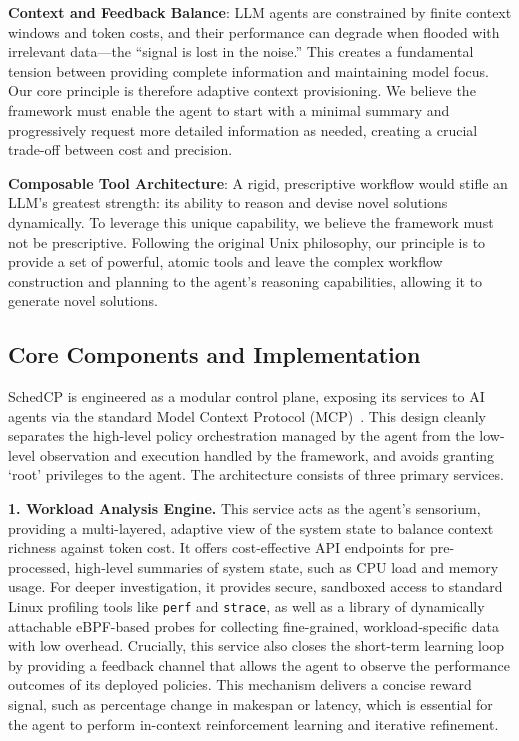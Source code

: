 \textbf{Context and Feedback Balance}: LLM agents are constrained by finite context windows and token costs, and their performance can degrade when flooded with irrelevant data—the ``signal is lost in the noise.'' This creates a fundamental tension between providing complete information and maintaining model focus. Our core principle is therefore adaptive context provisioning. We believe the framework must enable the agent to start with a minimal summary and progressively request more detailed information as needed, creating a crucial trade-off between cost and precision.

\textbf{Composable Tool Architecture}: A rigid, prescriptive workflow would stifle an LLM's greatest strength: its ability to reason and devise novel solutions dynamically. To leverage this unique capability, we believe the framework must not be prescriptive. Following the original Unix philosophy, our principle is to provide a set of powerful, atomic tools and leave the complex workflow construction and planning to the agent's reasoning capabilities, allowing it to generate novel solutions.

\subsection{Core Components and Implementation}
SchedCP is engineered as a modular control plane, exposing its services to AI agents via the standard Model Context Protocol (MCP)~\cite{anthropic2024mcp}. This design cleanly separates the high-level policy orchestration managed by the agent from the low-level observation and execution handled by the framework, and avoids granting `root' privileges to the agent. The architecture consists of three primary services.

\textbf{1. Workload Analysis Engine.} This service acts as the agent's sensorium, providing a multi-layered, adaptive view of the system state to balance context richness against token cost. It offers cost-effective API endpoints for pre-processed, high-level summaries of system state, such as CPU load and memory usage. For deeper investigation, it provides secure, sandboxed access to standard Linux profiling tools like \texttt{perf} and \texttt{strace}, as well as a library of dynamically attachable eBPF-based probes for collecting fine-grained, workload-specific data with low overhead. Crucially, this service also closes the short-term learning loop by providing a feedback channel that allows the agent to observe the performance outcomes of its deployed policies. This mechanism delivers a concise reward signal, such as percentage change in makespan or latency, which is essential for the agent to perform in-context reinforcement learning and iterative refinement.

